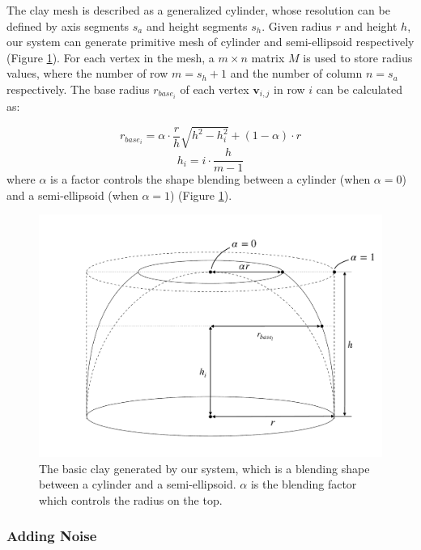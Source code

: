 \documentclass{svjour3}                     %
\begin{document}
The clay mesh is described as a generalized cylinder, whose resolution can be defined by axis segments $s_{a}$ and height segments $s_{h}$. Given radius $r$ and height $h$, our system can generate primitive mesh of cylinder and semi-ellipsoid respectively (Figure \ref{fig:base}).
For each vertex in the mesh, a $m \times n$ matrix $M$ is used to store radius values, where the number of row $m = s_{h} + 1$ and the number of column $n = s_{a}$ respectively. The base radius $r_{base_{i}}$ of each vertex $\mathbf{v}_{i,j}$ in row $i$ can be calculated as: 

\begin{equation}
r_{base_{i}} = \alpha \cdot \frac{r}{h} \sqrt{h^2 -  h_{i}^2} + (1 - \alpha) \cdot r
\end{equation}
\begin{equation}
h_{i} = i \cdot \frac{h}{m-1}
\end{equation}
where $\alpha$ is a factor controls the shape blending between a cylinder (when $\alpha=0$) and a semi-ellipsoid (when $\alpha=1$) (Figure \ref{fig:base}).

\begin{figure}
\includegraphics[width=\textwidth]{fig4.pdf}
\caption{The basic clay generated by our system, which is a blending shape between a cylinder and a semi-ellipsoid. $\alpha$ is the blending factor which controls the radius on the top.}
\label{fig:base}
\end{figure}

\subsubsection{Adding Noise}
\end{document}
